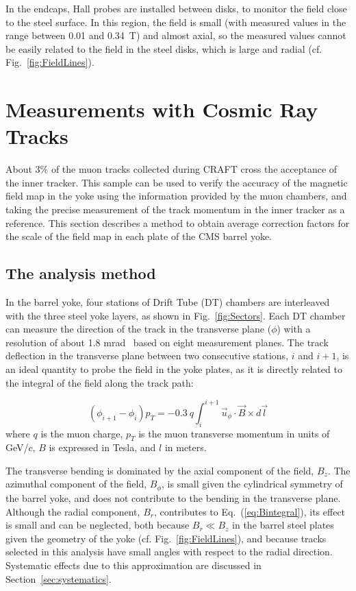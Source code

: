 In the endcaps, Hall probes are installed between disks, to monitor
the field close to the steel surface. In this region, the field is small
(with measured values in the range between 0.01 and 0.34~T) and almost
axial, so the measured values cannot be easily related to the
field in the steel disks, which is large and radial
(cf. Fig.~\ref{fig:FieldLines}).

\section{Measurements with Cosmic Ray Tracks}
\label{sec:CRAFT}
About 3\% of the muon tracks collected during CRAFT cross the acceptance of
the inner tracker.
This sample can be used to verify the accuracy of the magnetic field
map in the yoke using the information provided by the muon chambers,
and taking the precise measurement of the track momentum in the inner tracker as a reference.
This section describes a method to obtain average correction factors for the
scale of the field map in each plate of the CMS barrel yoke.


\subsection{The analysis method}
\label{sec:CRAFTBarrel}

In the barrel yoke, four stations of Drift Tube (DT) chambers are
interleaved with the three steel yoke layers, as shown in Fig.~\ref{fig:Sectors}.
Each DT chamber can measure the direction of the track in the
transverse plane ($\phi$) with a resolution of about 1.8
mrad~\cite{CFTDTPerf} based on eight measurement planes.
The track deflection in the transverse plane between two consecutive
stations, $i$ and $i+1$, is an ideal
quantity to probe the field in the yoke plates, as it is directly
related to the integral of the field along the track path:

\begin{equation}
(\phi_{i+1} -\phi_i) p_T =
-0.3\ q
\int^{i+1}_{i}\vec{u}_{\phi}\cdot\vec{B}\times d\vec{l}
\label{eq:Bintegral}
\end{equation}
where $q$ is the muon charge, $p_T$ is the muon transverse momentum in
units of GeV/$c$,
$B$ is expressed in Tesla, and $l$ in meters.

The transverse bending is dominated by the axial
component of the field, $B_z$. The azimuthal component of
the field, $B_\phi$,
is small given the cylindrical symmetry of the barrel yoke, and does
not contribute to the bending in the transverse plane.
Although the radial component, $B_r$,
contributes to Eq.~(\ref{eq:Bintegral}), its
effect is small and can be neglected, both because $B_r\ll B_z$ in the
barrel steel plates given the geometry of the yoke
(cf. Fig.~\ref{fig:FieldLines}),
and because tracks selected in this analysis have small angles with respect to the radial direction. Systematic effects due to this approximation are
discussed in Section~\ref{sec:systematics}.

